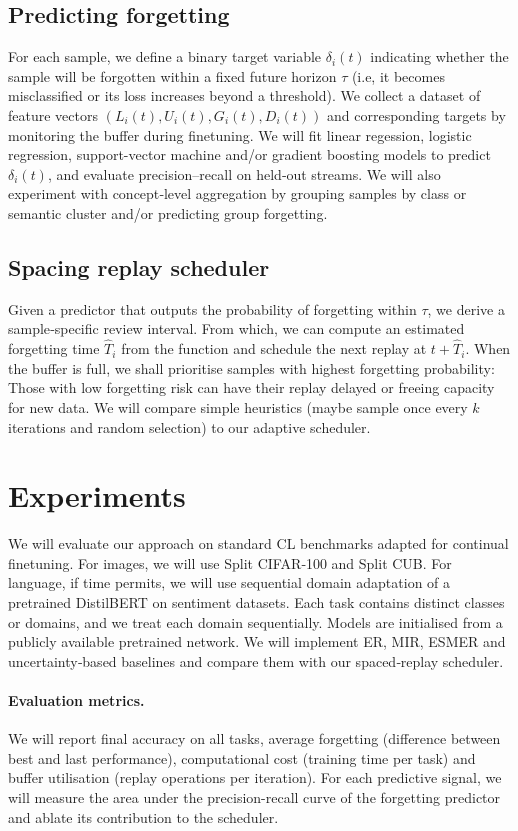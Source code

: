 \documentclass{article}
\begin{document}
\subsection{Predicting forgetting}
For each sample, we define a binary target variable $\delta_i(t)$ indicating whether the sample will be forgotten within a fixed future horizon $\tau$ (i.e, it becomes misclassified or its loss increases beyond a threshold).  We collect a dataset of feature vectors $(L_i(t), U_i(t), G_i(t), D_i(t))$ and corresponding targets by monitoring the buffer during finetuning.  We will fit linear regession, logistic regression, support-vector machine and/or gradient boosting models to predict $\delta_i(t)$, and evaluate precision–recall on held\mbox{‑}out streams.  We will also experiment with concept\mbox{‑}level aggregation by grouping samples by class or semantic cluster and/or predicting group forgetting.

\subsection{Spacing replay scheduler}
Given a predictor that outputs the probability of forgetting within $\tau$, we derive a sample\mbox{‑}specific review interval.  From which, we can compute an estimated forgetting time $\hat{T}_i$ from the function and schedule the next replay at $t + \hat{T}_i$.  When the buffer is full, we shall prioritise samples with highest forgetting probability: Those with low forgetting risk can have their replay delayed or freeing capacity for new data.  We will compare simple heuristics (maybe sample once every $k$ iterations and random selection) to our adaptive scheduler.

\section{Experiments}
We will evaluate our approach on standard CL benchmarks adapted for continual finetuning.  For images, we will use Split CIFAR\mbox{‑}100 and Split CUB. For language, if time permits, we will use sequential domain adaptation of a pretrained DistilBERT on sentiment datasets.  Each task contains distinct classes or domains, and we treat each domain sequentially.  Models are initialised from a publicly available pretrained network.  We will implement ER, MIR, ESMER and uncertainty\mbox{‑}based baselines and compare them with our spaced\mbox{‑}replay scheduler.

\paragraph{Evaluation metrics.}  We will report final accuracy on all tasks, average forgetting (difference between best and last performance), computational cost (training time per task) and buffer utilisation (replay operations per iteration).  For each predictive signal, we will measure the area under the precision-recall curve of the forgetting predictor and ablate its contribution to the scheduler.
\end{document}
